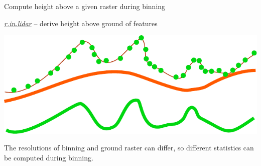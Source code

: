 \documentclass[xcolor={dvipsnames,usenames},beamer,aspectratio=169]{beamer}
\newcommand{\gmodule}[1]{\href{http://grass.osgeo.org/grass71/manuals/#1.html}{\emph{#1}}}
\begin{document}
\begin{frame}{Compute height above a given raster during binning}

\gmodule{r.in.lidar} -- derive height above ground of features

\begin{center}
\includegraphics[height=0.5\textheight]{images/features/base_raster}
\end{center}

The resolutions of binning and ground raster can differ, so different
statistics can be computed during binning.

\end{frame}
\end{document}
